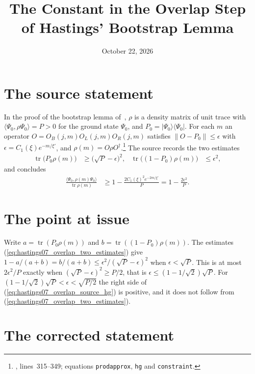 \documentclass{article}
\title{The Constant in the Overlap Step of Hastings' Bootstrap Lemma}
\author{}
\date{October 22, 2026}
\begin{document}
\maketitle
{}

\section{The source statement}

In the proof of the bootstrap lemma of~\cite{Hastings2007AreaLaw}, $\rho$ is a
density matrix of unit trace with $\langle\Psi_0,\rho\Psi_0\rangle=P>0$ for the
ground state $\Psi_0$, and $P_0=|\Psi_0\rangle\langle\Psi_0|$. For each $m$ an
operator $O=O_B(j,m)O_L(j,m)O_R(j,m)$ satisfies
$\lVert O-P_0\rVert\le\epsilon$ with $\epsilon=C_1(\xi)e^{-m/\xi'}$, and
$\rho(m)=O\rho O^\dagger$.\footnote{,
    lines~315--349; equations \texttt{prodapprox}, \texttt{hg} and
    \texttt{constraint}.}
The source records the two estimates
\begin{align}
    \operatorname{tr}\bigl(P_0\rho(m)\bigr)
     & \ge\bigl(\sqrt P-\epsilon\bigr)^2,
    &
    \operatorname{tr}\bigl((1-P_0)\rho(m)\bigr)
     & \le\epsilon^2,
    \label{eq:hastings07_overlap_two_estimates}
\end{align}
and concludes
\begin{align}
    \frac{\langle\Psi_0,\rho(m)\Psi_0\rangle}{\operatorname{tr}\rho(m)}
     & \ge1-\frac{2C_1(\xi)^2e^{-2m/\xi'}}{P}
    =1-\frac{2\epsilon^2}{P}.
    \label{eq:hastings07_overlap_source_hg}
\end{align}

\section{The point at issue}

Write $a=\operatorname{tr}(P_0\rho(m))$ and $b=\operatorname{tr}((1-P_0)\rho(m))$.
The estimates (\ref{eq:hastings07_overlap_two_estimates}) give
$1-a/(a+b)=b/(a+b)\le\epsilon^2/(\sqrt P-\epsilon)^2$ when $\epsilon<\sqrt P$.
This is at most $2\epsilon^2/P$ exactly when
$(\sqrt P-\epsilon)^2\ge P/2$, that is $\epsilon\le(1-1/\sqrt2)\sqrt P$. For
$(1-1/\sqrt2)\sqrt P<\epsilon<\sqrt{P/2}$ the right side of
(\ref{eq:hastings07_overlap_source_hg}) is positive, and it does not follow
from (\ref{eq:hastings07_overlap_two_estimates}).

\section{The corrected statement}
\end{document}
